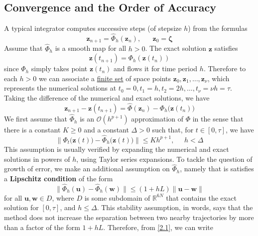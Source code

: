  \subsection{Convergence and the Order of Accuracy}

    A typical integrator computes successive steps (of stepsize $h$) from the formulas 
    \begin{equation}
      \mathbf{z}_{n+1} = \hat{\Phi}_h (\mathbf{z}_n), \;\;\;\;\;\; \mathbf{z}_0 = \boldsymbol{\zeta}
    \end{equation}
    Assume that $\hat{\Phi}_h$ is a smooth map for all $h > 0$. The exact solution $\mathbf{z}$ satisfies
    \begin{equation}
      \mathbf{z} (t_{n+1}) = \Phi_h (\mathbf{z}(t_n))
    \end{equation}
    since $\Phi_h$ simply takes point $\mathbf{z}(t_n)$ and flows it for time period $h$. Therefore to each $h > 0$ we can associate a \hyperref[st-def:finite-set]{finite set} of space points $\mathbf{z}_0, \mathbf{z}_1, \ldots, \mathbf{z}_\nu$, which represents the numerical solutions at $t_0 = 0, t_1 = h, t_2 = 2h, \ldots, t_\nu = \nu h = \tau$. Taking the difference of the numerical and exact solutions, we have 
    \begin{equation}
      \mathbf{z}_{n+1} - \mathbf{z}(t_{n+1}) = \hat{\Phi}(\mathbf{z}_n) - \Phi_h \big(\mathbf{z}(t_n) \big) \label{2.1} \tag{2.1}
    \end{equation}
    We first assume that $\hat{\Phi}_h$ is an $\mathcal{O}(h^{p+1})$ approximation of $\Phi$ in the sense that there is a constant $K \geq 0$ and a constant $\Delta > 0$ such that, for $t \in [0, \tau]$, we have 
    \begin{equation}
      \| \Phi_t\big(\mathbf{z}(t)\big) - \hat{\Phi}_h \big(\mathbf{z}(t)\big) \| \leq K h^{p+1}, \;\;\;\;\; h < \Delta
    \end{equation}
    This assumption is usually verified by expanding the numerical and exact solutions in powers of $h$, using Taylor series expansions. To tackle the question of growth of error, we make an additional assumption on $\hat{\Phi}_h$, namely that is satisfies a \textbf{Lipschitz condition} of the form 
    \begin{equation}
      \|\hat{\Phi}_h (\mathbf{u}) - \hat{\Phi}_h (\mathbf{w})\| \leq (1 + h L) \| \mathbf{u} - \mathbf{w}\|
    \end{equation}
    for all $\mathbf{u}, \mathbf{w} \in D$, where $D$ is some subdomain of $\mathbb{R}^{6N}$ that contains the exact solution for $[0, \tau]$, and $h \leq \Delta$. This stability assumption, in words, says that the method does not increase the separation between two nearby trajectories by more than a factor of the form $1 + hL$. Therefore, from \eqref{2.1}, we can write 
